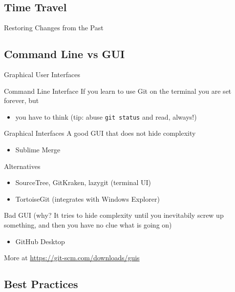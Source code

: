 \documentclass[xetex]{beamer}
\begin{document}
\subsection{Time Travel}

\begin{frame}{Restoring Changes from the Past}

\end{frame}

\subsection{Command Line vs GUI}

\begin{frame}{Graphical User Interfaces}
  \begin{block}{Command Line Interface}
    If you learn to use Git on the terminal you are set forever, but
    \begin{itemize}
      \item you have to think (tip: abuse \texttt{git status} and read, always!)
    \end{itemize}
  \end{block}
  \pause
  \begin{alertblock}{Graphical Interfaces}
    A good GUI that does not hide complexity
    \begin{itemize}
      \item Sublime Merge
    \end{itemize}
    Alternatives
    \begin{itemize}
      \item SourceTree, GitKraken, lazygit (terminal UI)
      \item TortoiseGit (integrates with Windows Explorer)
    \end{itemize}
    Bad GUI (why? It tries to hide complexity until you inevitabily screw up
    something, and then you have no clue what is going on)
    \begin{itemize}
      \item GitHub Desktop
    \end{itemize}
    More at \url{https://git-scm.com/downloads/guis}
  \end{alertblock}
\end{frame}

\subsection{Best Practices}
\end{document}
